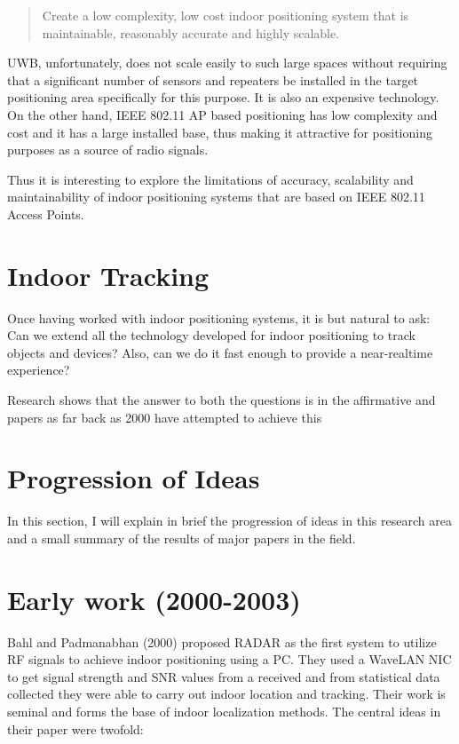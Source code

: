 \begin{quote}
Create a low complexity, low cost indoor positioning system that is
maintainable, reasonably accurate and highly scalable.
\end{quote}

UWB, unfortunately, does not scale easily to such large spaces without requiring
that a significant number of sensors and repeaters be installed in the target
positioning area specifically for this purpose. It is also an expensive
technology. On the other hand, IEEE 802.11 AP based positioning has low
complexity and cost and it has a large installed base, thus making it attractive
for positioning purposes as a source of radio signals.

Thus it is interesting to explore the limitations of accuracy, scalability and
maintainability of indoor positioning systems that are based on IEEE 802.11
Access Points.

\section{Indoor Tracking}

Once having worked with indoor positioning systems, it is but natural to ask:
Can we extend all the technology developed for indoor positioning to track 
objects and devices? Also, can we do it fast enough to provide a near-realtime
experience?

Research shows that the answer to both the questions is in the affirmative
and papers as far back as 2000 \cite{RADAR} have attempted to achieve this 

\section{Progression of Ideas}

In this section, I will explain in brief the progression of ideas in this 
research area and a small summary of the results of major papers in the 
field.

\section{Early work (2000-2003)}

Bahl and Padmanabhan\cite{RADAR} (2000) proposed RADAR as the first system to utilize RF signals to achieve indoor positioning using a PC. They used a WaveLAN NIC to get signal strength and SNR values from a received and from statistical data collected they were able to carry out indoor location and tracking. Their work is seminal and forms the base of indoor localization 
methods. The central ideas in their paper were twofold:

